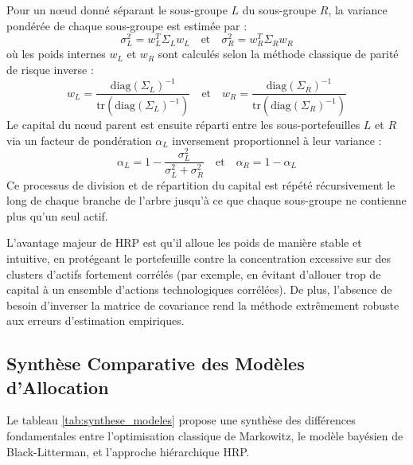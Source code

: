 Pour un nœud donné séparant le sous-groupe $L$ du sous-groupe $R$, la variance pondérée de chaque sous-groupe est estimée par :
\begin{equation}
    \sigma_L^2 = w_L^T \Sigma_L w_L \quad \text{et} \quad \sigma_R^2 = w_R^T \Sigma_R w_R
\end{equation}
où les poids internes $w_L$ et $w_R$ sont calculés selon la méthode classique de parité de risque inverse :
\begin{equation}
    w_L = \frac{\text{diag}(\Sigma_L)^{-1}}{\text{tr}(\text{diag}(\Sigma_L)^{-1})} \quad \text{et} \quad w_R = \frac{\text{diag}(\Sigma_R)^{-1}}{\text{tr}(\text{diag}(\Sigma_R)^{-1})}
\end{equation}
Le capital du nœud parent est ensuite réparti entre les sous-portefeuilles $L$ et $R$ via un facteur de pondération $\alpha_L$ inversement proportionnel à leur variance :
\begin{equation}
    \alpha_L = 1 - \frac{\sigma_L^2}{\sigma_L^2 + \sigma_R^2} \quad \text{et} \quad \alpha_R = 1 - \alpha_L
\end{equation}
Ce processus de division et de répartition du capital est répété récursivement le long de chaque branche de l'arbre jusqu'à ce que chaque sous-groupe ne contienne plus qu'un seul actif. 

L'avantage majeur de HRP est qu'il alloue les poids de manière stable et intuitive, en protégeant le portefeuille contre la concentration excessive sur des clusters d'actifs fortement corrélés (par exemple, en évitant d'allouer trop de capital à un ensemble d'actions technologiques corrélées). De plus, l'absence de besoin d'inverser la matrice de covariance rend la méthode extrêmement robuste aux erreurs d'estimation empiriques.

\subsection{Synthèse Comparative des Modèles d'Allocation}
Le tableau \ref{tab:synthese_modeles} propose une synthèse des différences fondamentales entre l'optimisation classique de Markowitz, le modèle bayésien de Black-Litterman, et l'approche hiérarchique HRP.

